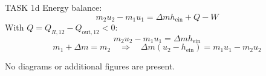 TASK 1d  
Energy balance:  
\[
m_2 u_2 - m_1 u_1 = \Delta m h_{\text{ein}} + Q - W
\]  
With \( Q = Q_{R,12} - Q_{\text{out},12} < 0 \):  
\[
m_2 u_2 - m_1 u_1 = \Delta m h_{\text{ein}}
\]  
\[
m_1 + \Delta m = m_2 \quad \Rightarrow \quad \Delta m (u_2 - h_{\text{ein}}) = m_1 u_1 - m_2 u_2
\]  

No diagrams or additional figures are present.